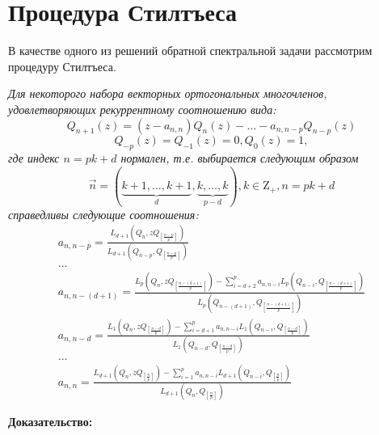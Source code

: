 \section{Процедура Стилтъеса} В качестве одного из решений
обратной спектральной задачи рассмотрим процедуру
Стилтъеса.
\begin{teor}
\it 
Для некоторого набора векторных ортогональных многочленов, удовлетворяющих
рекуррентному соотношению вида:
\begin{equation}
\label{StieltO}
Q_{n+1}(z)=(z-a_{n,n})Q_n(z)-\ldots-a_{n,n-p}Q_{n-p}(z)
\end{equation}
$$
Q_{-p}(z)=Q_{-1}(z)=0,  Q_0(z)=1,
$$
где индекс $n=pk+d$ нормален, т.е. выбирается следующим образом
$$\overrightarrow{n}=(\underbrace{k+1,\ldots,k+1}_{d},\underbrace{k,\ldots,k}_{p-d}),
k\in{\mbox{Z}}_{+},n=pk+d$$ 
справедливы следующие соотношения:
\begin{equation}
\label{StieltA}
\begin{array} {cccccccccccccc}
a_{n,n-p} = \displaystyle\frac{L_{d+1}(Q_n,zQ_{\left[\frac{n-p}{p}\right]})}{L_{d+1}(Q_{n-p},Q_{\left[\frac{n-p}{p}\right]})} \\
\ldots \\
a_{n,n-(d+1)} = \displaystyle\frac{L_{p}(Q_n,zQ_{\left[\frac{n-(d+1)}{p}\right]}) - \displaystyle\sum\limits_{i=d+2}^{p} {a_{n,n-i}L_p(Q_{n-i},Q_{\left[\frac{n-(d+1)}{p}\right]})}}{L_{p}(Q_{n-(d+1)},Q_{\left[\frac{n-(d+1)}{p}\right]})} \\
a_{n,n-d} = \displaystyle\frac{L_{1}(Q_n,zQ_{\left[\frac{n-d}{p}\right]}) - \displaystyle\sum\limits_{i=d+1}^{p} {a_{n,n-i}L_1(Q_{n-i},Q_{\left[\frac{n-d}{p}\right]})}}{L_{1}(Q_{n-d},Q_{\left[\frac{n-d}{p}\right]})} \\
\ldots \\
a_{n,n} = \displaystyle\frac{L_{d+1}(Q_n,zQ_{\left[\frac{n}{p}\right]}) - \displaystyle\sum\limits_{i=1}^{p} {a_{n,n-i}L_{d+1}(Q_{n-i},Q_{\left[\frac{n}{p}\right]})}}{L_{d+1}(Q_{n},Q_{\left[\frac{n}{p}\right]})}
\end{array}
\end{equation}
\end{teor}
\bf Доказательство: \rm \\
